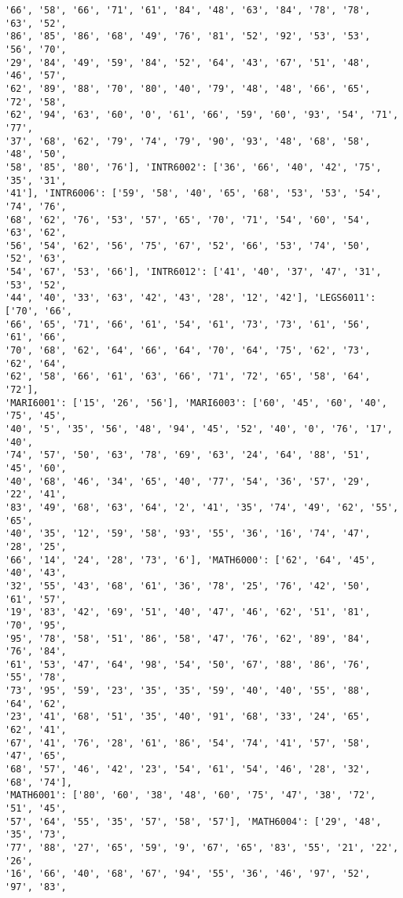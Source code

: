 \documentclass[11pt]{article}
\begin{document}
\begin{Verbatim}[commandchars=\\\{\}]
'66', '58', '66', '71', '61', '84', '48', '63', '84', '78', '78', '63', '52',
'86', '85', '86', '68', '49', '76', '81', '52', '92', '53', '53', '56', '70',
'29', '84', '49', '59', '84', '52', '64', '43', '67', '51', '48', '46', '57',
'62', '89', '88', '70', '80', '40', '79', '48', '48', '66', '65', '72', '58',
'62', '94', '63', '60', '0', '61', '66', '59', '60', '93', '54', '71', '77',
'37', '68', '62', '79', '74', '79', '90', '93', '48', '68', '58', '48', '50',
'58', '85', '80', '76'], 'INTR6002': ['36', '66', '40', '42', '75', '35', '31',
'41'], 'INTR6006': ['59', '58', '40', '65', '68', '53', '53', '54', '74', '76',
'68', '62', '76', '53', '57', '65', '70', '71', '54', '60', '54', '63', '62',
'56', '54', '62', '56', '75', '67', '52', '66', '53', '74', '50', '52', '63',
'54', '67', '53', '66'], 'INTR6012': ['41', '40', '37', '47', '31', '53', '52',
'44', '40', '33', '63', '42', '43', '28', '12', '42'], 'LEGS6011': ['70', '66',
'66', '65', '71', '66', '61', '54', '61', '73', '73', '61', '56', '61', '66',
'70', '68', '62', '64', '66', '64', '70', '64', '75', '62', '73', '62', '64',
'62', '58', '66', '61', '63', '66', '71', '72', '65', '58', '64', '72'],
'MARI6001': ['15', '26', '56'], 'MARI6003': ['60', '45', '60', '40', '75', '45',
'40', '5', '35', '56', '48', '94', '45', '52', '40', '0', '76', '17', '40',
'74', '57', '50', '63', '78', '69', '63', '24', '64', '88', '51', '45', '60',
'40', '68', '46', '34', '65', '40', '77', '54', '36', '57', '29', '22', '41',
'83', '49', '68', '63', '64', '2', '41', '35', '74', '49', '62', '55', '65',
'40', '35', '12', '59', '58', '93', '55', '36', '16', '74', '47', '28', '25',
'66', '14', '24', '28', '73', '6'], 'MATH6000': ['62', '64', '45', '40', '43',
'32', '55', '43', '68', '61', '36', '78', '25', '76', '42', '50', '61', '57',
'19', '83', '42', '69', '51', '40', '47', '46', '62', '51', '81', '70', '95',
'95', '78', '58', '51', '86', '58', '47', '76', '62', '89', '84', '76', '84',
'61', '53', '47', '64', '98', '54', '50', '67', '88', '86', '76', '55', '78',
'73', '95', '59', '23', '35', '35', '59', '40', '40', '55', '88', '64', '62',
'23', '41', '68', '51', '35', '40', '91', '68', '33', '24', '65', '62', '41',
'67', '41', '76', '28', '61', '86', '54', '74', '41', '57', '58', '47', '65',
'68', '57', '46', '42', '23', '54', '61', '54', '46', '28', '32', '68', '74'],
'MATH6001': ['80', '60', '38', '48', '60', '75', '47', '38', '72', '51', '45',
'57', '64', '55', '35', '57', '58', '57'], 'MATH6004': ['29', '48', '35', '73',
'77', '88', '27', '65', '59', '9', '67', '65', '83', '55', '21', '22', '26',
'16', '66', '40', '68', '67', '94', '55', '36', '46', '97', '52', '97', '83',

\end{Verbatim}
\end{document}
